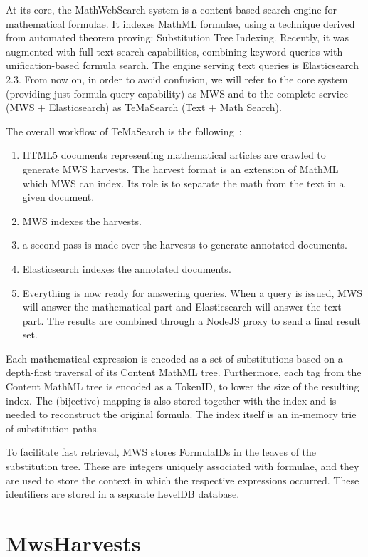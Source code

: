 \documentclass{deliverablereport}
\begin{document}
At its core, the MathWebSearch system is a content-based search engine for mathematical
formulae. It indexes MathML formulae, using a technique derived from automated theorem
proving: Substitution Tree Indexing. Recently, it was augmented with full-text search
capabilities, combining keyword queries with unification-based formula search. The engine
serving text queries is Elasticsearch 2.3. From now on, in order to avoid confusion, we
will refer to the core system (providing just formula query capability) as MWS and to the
complete service (MWS + Elasticsearch) as TeMaSearch (Text + Math Search).

The overall workflow of TeMaSearch is the following~\cite{Ham:bcs15}: 

\begin{enumerate}
\item HTML5 documents representing mathematical articles are crawled to generate MWS
  harvests. The harvest format is an extension of MathML which MWS can index. Its role is
  to separate the math from the text in a given document.
\item MWS indexes the harvests.
\item a second pass is made over the harvests to generate annotated documents.
\item Elasticsearch indexes the annotated documents.
\item Everything is now ready for answering queries. When a query is issued, MWS will
  answer the mathematical part and Elasticsearch will answer the text part. The results
  are combined through a NodeJS proxy to send a final result set.
\end{enumerate}

Each mathematical expression is encoded as a set of substitutions based on a depth-first
traversal of its Content MathML tree. Furthermore, each tag from the Content MathML tree
is encoded as a TokenID, to lower the size of the resulting index. The (bijective) mapping
is also stored together with the index and is needed to reconstruct the original
formula. The index itself is an in-memory trie of substitution paths.

To facilitate fast retrieval, MWS stores FormulaIDs in the leaves of the substitution
tree. These are integers uniquely associated with formulae, and they are used to store the
context in which the respective expressions occurred. These identifiers are stored in a
separate LevelDB database.

\section{MwsHarvests}\label{sec:harvests}
\end{document}
